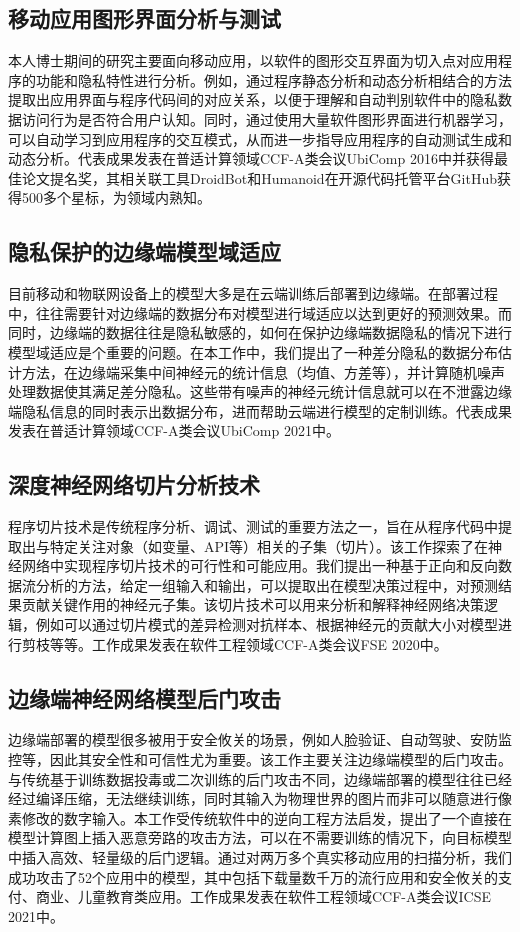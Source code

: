 \documentclass[12pt]{article}
\begin{document}
\subsection{移动应用图形界面分析与测试}
本人博士期间的研究主要面向移动应用，以软件的图形交互界面为切入点对应用程序的功能和隐私特性进行分析。例如，通过程序静态分析和动态分析相结合的方法提取出应用界面与程序代码间的对应关系，以便于理解和自动判别软件中的隐私数据访问行为是否符合用户认知。同时，通过使用大量软件图形界面进行机器学习，可以自动学习到应用程序的交互模式，从而进一步指导应用程序的自动测试生成和动态分析。代表成果\cite{li2016peruim}发表在普适计算领域CCF-A类会议UbiComp 2016中并获得最佳论文提名奖，其相关联工具DroidBot\cite{li2017droidbot}和Humanoid\cite{li2019humanoid}在开源代码托管平台GitHub获得500多个星标\cite{droidbot:code}，为领域内熟知。
 
\subsection{隐私保护的边缘端模型域适应}
目前移动和物联网设备上的模型大多是在云端训练后部署到边缘端。在部署过程中，往往需要针对边缘端的数据分布对模型进行域适应以达到更好的预测效果。而同时，边缘端的数据往往是隐私敏感的，如何在保护边缘端数据隐私的情况下进行模型域适应是个重要的问题。在本工作中，我们提出了一种差分隐私的数据分布估计方法，在边缘端采集中间神经元的统计信息（均值、方差等），并计算随机噪声处理数据使其满足差分隐私。这些带有噪声的神经元统计信息就可以在不泄露边缘端隐私信息的同时表示出数据分布，进而帮助云端进行模型的定制训练。代表成果\cite{liu2020pmc}发表在普适计算领域CCF-A类会议UbiComp 2021中。

\subsection{深度神经网络切片分析技术}
程序切片技术是传统程序分析、调试、测试的重要方法之一，旨在从程序代码中提取出与特定关注对象（如变量、API等）相关的子集（切片）。该工作探索了在神经网络中实现程序切片技术的可行性和可能应用。我们提出一种基于正向和反向数据流分析的方法，给定一组输入和输出，可以提取出在模型决策过程中，对预测结果贡献关键作用的神经元子集。该切片技术可以用来分析和解释神经网络决策逻辑，例如可以通过切片模式的差异检测对抗样本、根据神经元的贡献大小对模型进行剪枝等等。工作成果\cite{zhang2020dynamic}发表在软件工程领域CCF-A类会议FSE 2020中。

\subsection{边缘端神经网络模型后门攻击}
边缘端部署的模型很多被用于安全攸关的场景，例如人脸验证、自动驾驶、安防监控等，因此其安全性和可信性尤为重要。该工作主要关注边缘端模型的后门攻击。与传统基于训练数据投毒或二次训练的后门攻击不同，边缘端部署的模型往往已经经过编译压缩，无法继续训练，同时其输入为物理世界的图片而非可以随意进行像素修改的数字输入。本工作受传统软件中的逆向工程方法启发，提出了一个直接在模型计算图上插入恶意旁路的攻击方法，可以在不需要训练的情况下，向目标模型中插入高效、轻量级的后门逻辑。通过对两万多个真实移动应用的扫描分析，我们成功攻击了52个应用中的模型，其中包括下载量数千万的流行应用和安全攸关的支付、商业、儿童教育类应用。工作成果\cite{li2021deeppayload}发表在软件工程领域CCF-A类会议ICSE 2021中。
\end{document}
